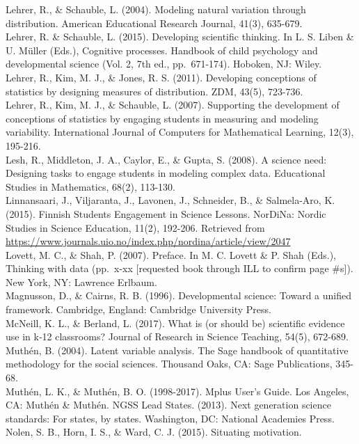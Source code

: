 \documentclass[]{book}
\theoremstyle{definition}
\theoremstyle{definition}
\theoremstyle{definition}
\theoremstyle{remark}
\begin{document}
Lehrer, R., \& Schauble, L. (2004). Modeling natural variation through
distribution. American Educational Research Journal, 41(3), 635-679.\\
Lehrer, R. \& Schauble, L. (2015). Developing scientific thinking. In L.
S. Liben \& U. Müller (Eds.), Cognitive processes. Handbook of child
psychology and developmental science (Vol. 2, 7th ed., pp.~671-174).
Hoboken, NJ: Wiley.\\
Lehrer, R., Kim, M. J., \& Jones, R. S. (2011). Developing conceptions
of statistics by designing measures of distribution. ZDM, 43(5),
723-736.\\
Lehrer, R., Kim, M. J., \& Schauble, L. (2007). Supporting the
development of conceptions of statistics by engaging students in
measuring and modeling variability. International Journal of Computers
for Mathematical Learning, 12(3), 195-216.\\
Lesh, R., Middleton, J. A., Caylor, E., \& Gupta, S. (2008). A science
need: Designing tasks to engage students in modeling complex data.
Educational Studies in Mathematics, 68(2), 113-130.\\
Linnansaari, J., Viljaranta, J., Lavonen, J., Schneider, B., \&
Salmela-Aro, K. (2015). Finnish Students Engagement in Science Lessons.
NorDiNa: Nordic Studies in Science Education, 11(2), 192-206. Retrieved
from
\url{https://www.journals.uio.no/index.php/nordina/article/view/2047}\\
Lovett, M. C., \& Shah, P. (2007). Preface. In M. C. Lovett \& P. Shah
(Eds.), Thinking with data (pp.~x-xx {[}requested book through ILL to
confirm page \#s{]}). New York, NY: Lawrence Erlbaum.\\
Magnusson, D., \& Cairns, R. B. (1996). Developmental science: Toward a
unified framework. Cambridge, England: Cambridge University Press.\\
McNeill, K. L., \& Berland, L. (2017). What is (or should be) scientific
evidence use in k‐12 classrooms? Journal of Research in Science
Teaching, 54(5), 672-689.\\
Muthén, B. (2004). Latent variable analysis. The Sage handbook of
quantitative methodology for the social sciences. Thousand Oaks, CA:
Sage Publications, 345-68.\\
Muthén, L. K., \& Muthén, B. O. (1998-2017). Mplus User's Guide. Los
Angeles, CA: Muthén \& Muthén. NGSS Lead States. (2013). Next generation
science standards: For states, by states. Washington, DC: National
Academies Press.\\
Nolen, S. B., Horn, I. S., \& Ward, C. J. (2015). Situating motivation.
\end{document}
